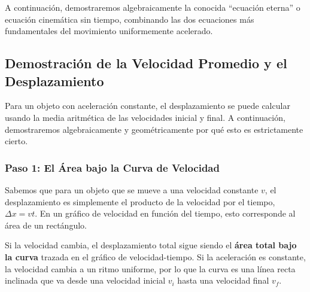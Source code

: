 \documentclass[11pt,a4paper]{book}
\begin{document}
A continuación, demostraremos algebraicamente la conocida ``ecuación eterna'' o ecuación cinemática sin tiempo, combinando las dos ecuaciones más fundamentales del movimiento uniformemente acelerado.


\subsection{Demostración de la Velocidad Promedio y el Desplazamiento}

Para un objeto con aceleración constante, el desplazamiento se puede calcular usando la media aritmética de las velocidades inicial y final. A continuación, demostraremos algebraicamente y geométricamente por qué esto es estrictamente cierto.

\subsubsection{Paso 1: El Área bajo la Curva de Velocidad}

Sabemos que para un objeto que se mueve a una velocidad constante $v$, el desplazamiento es simplemente el producto de la velocidad por el tiempo, $\Delta x = v t$. En un gráfico de velocidad en función del tiempo, esto corresponde al área de un rectángulo. 

Si la velocidad cambia, el desplazamiento total sigue siendo el \textbf{área total bajo la curva} trazada en el gráfico de velocidad-tiempo. Si la aceleración es constante, la velocidad cambia a un ritmo uniforme, por lo que la curva es una línea recta inclinada que va desde una velocidad inicial $v_i$ hasta una velocidad final $v_f$.

\begin{center}
\end{center}
\end{document}
